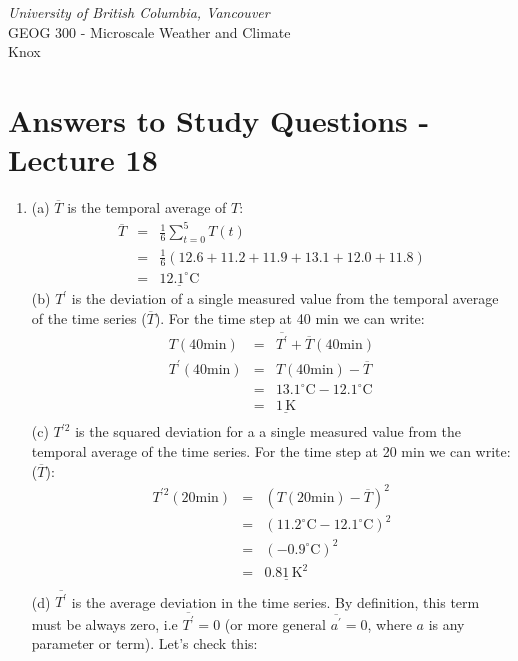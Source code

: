 \documentclass[11pt]{article}
\author{Andy Black and Andreas Christen}
\begin{document}
\begin{center}
\emph{University of British Columbia, Vancouver}\\
GEOG 300 - Microscale Weather and Climate\\
Knox
\section*{Answers to Study Questions - Lecture 18}
\end{center}

\begin{enumerate}

\item (a) $\overline{T}$ is the temporal average of $T$: \begin{eqnarray*}
\overline{T} &=& \frac{1}{6} \sum_{t=0}^{5} T(t) \\
&=& \frac{1}{6} \left(12.6 + 11.2 + 11.9 + 13.1 + 12.0 + 11.8 \right) \\
&=& \underline{12.1^{\circ}\textrm{C}}
\end{eqnarray*}
(b) $T^{\prime}$ is the deviation of a single measured value from the temporal average of the time series ($\overline{T}$). For the time step at 40 min we can write:  \begin{eqnarray*}
T(40\textrm{min}) &=& \overline{T^{\prime}} + \overline{T}(40\textrm{min}) \\
T^{\prime}(40\textrm{min}) &=& T(40\textrm{min}) - \overline{T} \\
 &=& 13.1^{\circ}\textrm{C} - 12.1^{\circ}\textrm{C} \\
 &=& \underline{1\, \textrm{K}}\\
\end{eqnarray*}
(c) $T^{\prime 2}$ is the squared deviation for a a single measured value from the temporal average of the time series. For the time step at 20 min we can write: ($\overline{T}$): \begin{eqnarray*}
T^{\prime 2}(20\textrm{min}) &=& (T(20\textrm{min}) - \overline{T})^2 \\
 &=& (11.2^{\circ}\textrm{C} - 12.1^{\circ}\textrm{C})^2 \\
 &=& (-0.9^{\circ}\textrm{C})^2 \\
 &=& \underline{0.81\, \textrm{K}^2}\\
\end{eqnarray*}
(d) $\overline{T^{\prime}}$ is the average deviation in the time series. By definition, this term must be always zero, i.e $\overline{T^{\prime}}=0$ (or more general $\overline{a^{\prime}} = 0$, where $a$ is any parameter or term). Let's check this: \begin{eqnarray*}

\end{eqnarray*}
\end{enumerate}
\end{document}
